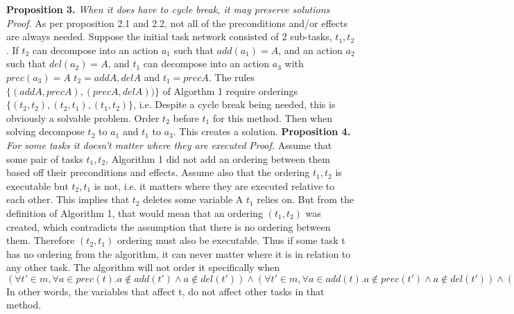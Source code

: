 \textbf{Proposition 3.} \textit{When it does have to cycle break, it may preserve solutions} \newline
\textit{Proof.}
As per proposition 2.1 and 2.2, not all of the preconditions and/or effects are always needed. Suppose the initial task network consisted of 2 sub-tasks, $t_1, t_2$. If $t_2$ can decompose into an action $a_1$ such that $add(a_1) = A$, and an action $a_2$ such that $del(a_2) = A$,
and $t_1$ can decompose into an action $a_3$ with $prec(a_3) = A$
$t_2 = {add A, del A}$ and $t_1 = {prec A}$. The rules $\{(add A, prec A), (prec A, del A))\}$ of Algorthm 1
require orderings $\{(t_2, t_2), (t_2, t_1), (t_1, t_2)\}$, i.e.
Despite a cycle break being needed, this is obviously a solvable problem. Order $t_2$ before $t_1$ for this method.
Then when solving decompose $t_2$ to $a_1$ and $t_1$ to $a_3$. This creates a solution. \newline \newline
\textbf{Proposition 4.} \textit{For some tasks it doesn't matter where they are executed} \newline
\textit{Proof.}
Assume that some pair of tasks $t_1, t_2$, Algorithm 1 did not add an ordering between them based
off their preconditions and effects. Assume also that the ordering $t_1, t_2$ is executable but $t_2,t_1$ is not, i.e.
it matters where they are executed relative to each other.  \newline  \newline
This implies that $t_2$ deletes some variable A $t_1$ relies on. But from the definition of Algorithm 1,
that would mean that an ordering $(t_1, t_2)$ was created, which contradicts the assumption that there is no ordering between them.
Therefore $(t_2, t_1)$ ordering must also be executable. \newline  \newline
Thus if some task t has no ordering from the algorithm, it can never matter where it is in relation to any other task.
The algorithm will not order it specifically when $(\forall t' \in m, \forall a \in prec(t). a \notin add(t') \land a \notin del(t'))
\land  (\forall t' \in m, \forall a \in add(t). a \notin prec(t') \land a \notin del(t')) 
\land  (\forall t' \in m, \forall a \in del(t). a \notin add(t') \land a \notin prec(t'))$
In other words, the variables that affect t, do not affect other tasks in that method.



